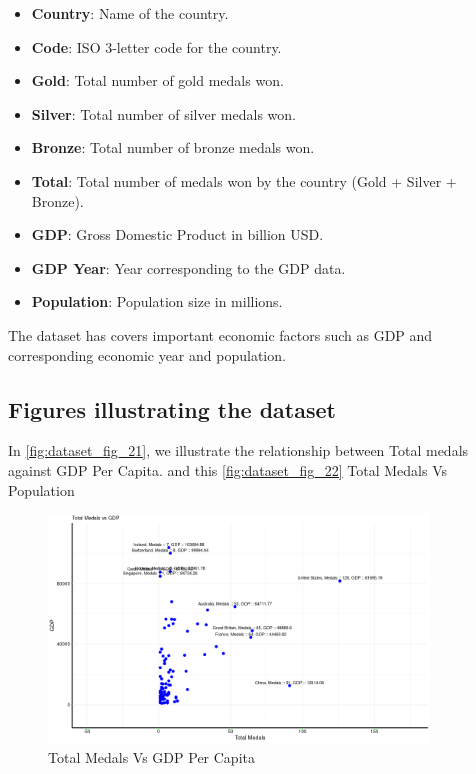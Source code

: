 \documentclass[a4paper,12pt]{article}
\begin{document}
 \begin{itemize}
     \item \textbf{Country}: Name of the country.
     \item \textbf{Code}: ISO 3-letter code for the country.
     \item \textbf{Gold}: Total number of gold medals won.
     \item \textbf{Silver}: Total number of silver medals won.
     \item \textbf{Bronze}: Total number of bronze medals won.
     \item \textbf{Total}: Total number of medals won by the country (Gold + Silver + Bronze).
     \item \textbf{GDP}: Gross Domestic Product in billion USD.
     \item \textbf{GDP Year}: Year corresponding to the GDP data.
     \item \textbf{Population}: Population size in millions.
 \end{itemize}
 














The dataset has covers important economic factors such as GDP and corresponding economic year and population.
\clearpage
\subsection{Figures illustrating the dataset}
In \autoref{fig:dataset_fig_21}, we illustrate the relationship between Total medals against GDP Per Capita. and this  \autoref{fig:dataset_fig_22} Total Medals Vs Population





\begin{figure}[H]
    \centering
    \includegraphics[width=0.9\textwidth]{images/Total_Medals_vs_GDP_plot.png}
    \caption{Total Medals Vs GDP Per Capita}
    \label{fig:dataset_fig_21}
\end{figure}
\end{document}
